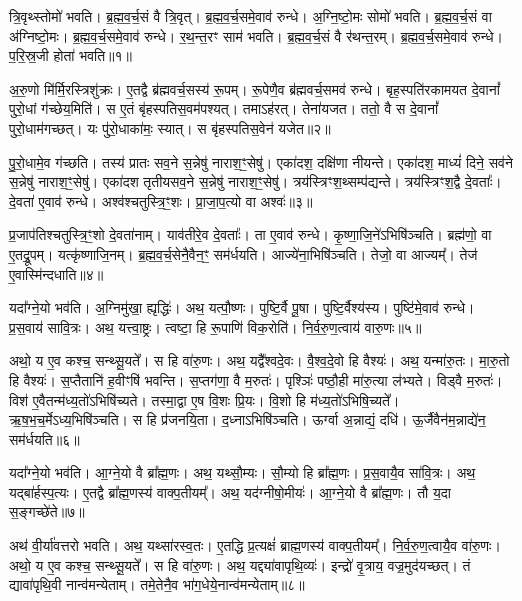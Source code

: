 त्रि॒वृथ्स्तोमो॑ भवति।
ब्र॒ह्म॒व॒र्च॒सं वै त्रि॒वृत्।
ब्र॒ह्म॒व॒र्च॒समे॒वाव॑ रुन्धे।
अ॒ग्नि॒ष्टो॒मः सोमो॑ भवति।
ब्र॒ह्म॒व॒र्च॒सं वा अ॑ग्निष्टो॒मः।
ब्र॒ह्म॒व॒र्च॒समे॒वाव॑ रुन्धे।
र॒थ॒न्त॒रꣳ साम॑ भवति।
ब्र॒ह्म॒व॒र्च॒सं वै र॑थन्त॒रम्।
ब्र॒ह्म॒व॒र्च॒समे॒वाव॑ रुन्धे।
प॒रि॒स्र॒जी होता॑ भवति॥१॥

अ॒रु॒णो मि॑र्मि॒रस्त्रिशु॑क्रः।
ए॒तद्वै ब्र॑ह्म\-वर्च॒सस्य॑ रू॒पम्।
रू॒पेणै॒व ब्र॑ह्म\-वर्च॒समव॑ रुन्धे। 
बृह॒स्पति॑रकामयत दे॒वानां᳚ पुरो॒धां ग॑च्छेय॒मिति॑।
स ए॒तं बृ॑हस्पतिस॒वम॑पश्यत्।
तमाऽह॑रत्।
तेना॑यजत।
ततो॒ वै स दे॒वानां᳚ पुरो॒धाम॑गच्छत्।
यः पु॑रो॒धाका॑मः॒ स्यात्।
स बृ॑हस्पतिस॒वेन॑ यजेत॥२॥

पु॒रो॒धामे॒व ग॑च्छति।
तस्य॑ प्रातः सव॒ने स॒न्नेषु॑ नाराश॒ꣳ॒सेषु॑।
एका॑दश॒ दक्षि॑णा नीयन्ते।
एका॑दश॒ माध्यं॑ दिने॒ सव॑ने स॒न्नेषु॑ नाराश॒ꣳ॒सेषु॑।
एका॑दश तृतीयसव॒ने स॒न्नेषु॑ नाराश॒ꣳ॒सेषु॑।
त्रय॑स्त्रिꣳश॒थ्सम्प॑द्यन्ते।
त्रय॑स्त्रिꣳश॒द्वै दे॒वताः᳚।
दे॒वता॑ ए॒वाव॑ रुन्धे।
अश्व॑श्चतुस्त्रि॒ꣳ॒शः।
प्रा॒जा॒प॒त्यो वा अश्वः॑॥३॥

प्र॒जा\-प॑तिश्चतुस्त्रि॒ꣳ॒शो दे॒वता॑नाम्।
याव॑तीरे॒व दे॒वताः᳚।
ता ए॒वाव॑ रुन्धे।
कृ॒ष्णा॒जि॒ने॑\-ऽभिषि॑ञ्चति।
ब्रह्म॑णो॒ वा ए॒तद्रू॒पम्।
यत्कृ॑ष्णाजि॒नम्।
ब्र॒ह्म॒व॒र्च॒सेनै॒वैन॒ꣳ॒ सम॑र्धयति।
आज्ये॑ना॒भिषि॑ञ्चति।
तेजो॒ वा आज्यम्᳚।
तेज॑ ए॒वास्मि॑न्दधाति॥४॥\anuvakamend[होता॑ भवति यजेत॒ वा अश्वो॑ दधाति]

यदा᳚ग्ने॒यो भव॑ति।
अ॒ग्निमु॑खा॒ ह्यृद्धिः॑।
अथ॒ यत्पौ॒ष्णः।
पुष्टि॒र्वै पू॒षा।
पुष्टि॒र्वैश्य॑स्य।
पुष्टि॑मे॒वाव॑ रुन्धे।
प्र॒स॒वाय॑ सावि॒त्रः।
अथ॒ यत्त्वा॒ष्ट्रः।
त्वष्टा॒ हि रू॒पाणि॑ विक॒रोति॑।
नि॒र्व॒रु॒ण॒त्वाय॑ वारु॒णः॥५॥

अथो॒ य ए॒व कश्च॒ सन्थ्सू॒यते᳚।
स हि वा॑रु॒णः।
अथ॒ यद्वै᳚श्वदे॒वः।
वै॒श्व॒दे॒वो हि वैश्यः॑।
अथ॒ यन्मा॑रु॒तः।
मा॒रु॒तो हि वैश्यः॑।
स॒प्तैतानि॑ ह॒वीꣳषि॑ भवन्ति।
स॒प्तग॑णा॒ वै म॒रुतः॑।
पृश्ञिः॑ पष्ठौ॒ही मा॑रु॒त्या ल॑भ्यते।
विड्वै म॒रुतः॑।
विश॑ ए॒वैतन्म॑ध्य॒तो॑\-ऽभिषि॑च्यते।
तस्मा॒द्वा ए॒ष वि॒शः प्रि॒यः।
वि॒शो हि म॑ध्य॒तो॑\-ऽभिषि॒च्यते᳚।
ऋ॒ष॒भ॒च॒र्मे\-ऽध्य॒भिषि॑ञ्चति।
स हि प्र॑जनयि॒ता।
द॒ध्ना\-ऽभिषि॑ञ्चति।
ऊर्ग्वा अ॒न्नाद्यं॒ दधि॑।
ऊ॒र्जैवैन॑म॒न्नाद्ये॑न॒ सम॑र्धयति॥६॥\anuvakamend[वा॒रु॒णो विड्वै म॒रुतो॒\-ऽष्टौ च॑]

यदा᳚ग्ने॒यो भव॑ति।
आ॒ग्ने॒यो वै ब्रा᳚ह्म॒णः।
अथ॒ यथ्सौ॒म्यः।
सौ॒म्यो हि ब्रा᳚ह्म॒णः।
प्र॒स॒वायै॒व सा॑वि॒त्रः।
अथ॒ यद्बा॑र्\mbox{}हस्प॒त्यः।
ए॒तद्वै ब्रा᳚ह्म॒णस्य॑ वाक्प॒तीयम्᳚।
अथ॒ यद॑ग्नीषो॒मीयः॑।
आ॒ग्ने॒यो वै ब्रा᳚ह्म॒णः।
तौ य॒दा स॒ङ्गच्छे॑ते॥७॥

अथ॑ वी॒र्या॑वत्तरो भवति।
अथ॒ यथ्सा॑रस्व॒तः।
ए॒तद्धि प्र॒त्यक्षं॑ ब्राह्म॒णस्य॑ वाक्प॒तीयम्᳚।
नि॒र्व॒रु॒ण॒त्वायै॒व वा॑रु॒णः।
अथो॒ य ए॒व कश्च॒ सन्थ्सू॒यते᳚।
स हि वा॑रु॒णः।
अथ॒ यद्द्या॑वापृथि॒व्यः॑।
इन्द्रो॑ वृ॒त्राय॒ वज्र॒मुद॑यच्छत्।
तं द्यावा॑पृथि॒वी नान्व॑मन्येताम्।
तमे॒तेनै॒व भा॑ग॒धेये॒नान्व॑मन्येताम्॥८॥

